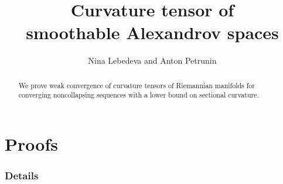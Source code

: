 \documentclass[a4paper,10pt]{article}
\begin{document}

\title{Curvature tensor of\\ smoothable Alexandrov spaces}
\date{}
\author{Nina Lebedeva and Anton Petrunin} 
\maketitle

\begin{abstract}
We prove weak convergence of curvature tensors of Riemannian manifolds 
for converging noncollapsing sequences with a lower bound on sectional curvature.
\end{abstract}




\tableofcontents




\part*{Proofs}











%

%
%
%

\section*{Details}






{\sloppy
\printbibliography[heading=bibintoc]
\fussy
}
\end{document}
